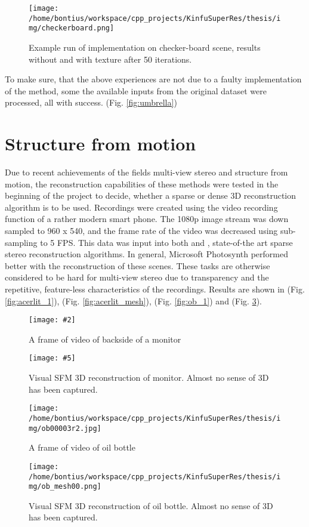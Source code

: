 \documentclass{ucl_thesis}
\newcommand{\myfig}[6]{%
\begin{figure}[h!]\centering%
	\begin{minipage}[b]{0.49\linewidth}\centering%
		\texttt{[image: \#2]}%
		\caption{#3}%
		\label{fig:#1}%
	\end{minipage}%
	\begin{minipage}[b]{0.49\linewidth}\centering%
		\texttt{[image: \#5]}%
		\caption{#6}%
		\label{fig:#4}%
	\end{minipage}%
\end{figure}%
}
\newcommand{\figref}[1]{(Fig. \ref{#1})}
\begin{document}
\begin{figure}[h!]\centering 
        \texttt{[image: /home/bontius/workspace/cpp\_projects/KinfuSuperRes/thesis/img/checkerboard.png]}        
        \caption{Example run of implementation on checker-board scene, results without and with texture after 50 iterations.}
        \label{fig:yang_checkerboard}
\end{figure}

To make sure, that the above experiences are not due to a faulty implementation of the method, some the available inputs from the original dataset were processed, all with success. \figref{fig:umbrella} %


\section{Structure from motion} 
\label{sec:sfm}

\par Due to recent achievements of the fields multi-view stereo and structure from motion, the reconstruction capabilities of these methods were tested in the beginning of the project to decide, whether a sparse or dense 3D reconstruction algorithm is to be used. Recordings were created using the video recording function of a rather modern smart phone. The 1080p image stream was down sampled to 960 x 540, and the frame rate of the video was decreased using sub-sampling to 5 FPS. This data was input into both \citep{Photosynth} and \citep{vsfm}, state-of-the art sparse stereo reconstruction algorithms. In general, Microsoft Photosynth performed better with the reconstruction of these scenes. These tasks are otherwise considered to be hard for multi-view stereo due to transparency and the repetitive, feature-less characteristics of the recordings. Results are shown in \figref{fig:acerlit_1}, \figref{fig:acerlit_mesh}, \figref{fig:ob_1} and \figref{fig:ob_mesh}.

\myfig
{fig:acerlit_1}
{/home/bontius/workspace/cpp_projects/KinfuSuperRes/thesis/img/acer_lit00706.jpg}
{A frame of video of backside of a monitor}
{fig:acerlit_mesh}
{/home/bontius/workspace/cpp_projects/KinfuSuperRes/thesis/img/acer_lit01.png}
{Visual SFM 3D reconstruction of monitor. Almost no sense of 3D has been captured.}

\begin{figure}[h!]\centering
	\begin{minipage}[b]{0.49\linewidth}\centering
		\texttt{[image: /home/bontius/workspace/cpp\_projects/KinfuSuperRes/thesis/img/ob00003r2.jpg]}
		\caption{A frame of video of oil bottle}
		\label{fig:ob_1}
	\end{minipage}
	\begin{minipage}[b]{0.49\linewidth}\centering
		\texttt{[image: /home/bontius/workspace/cpp\_projects/KinfuSuperRes/thesis/img/ob\_mesh00.png]}
		\caption{Visual SFM 3D reconstruction of oil bottle. Almost no sense of 3D has been captured.}
		\label{fig:ob_mesh}
	\end{minipage}
\end{figure}
\end{document}
